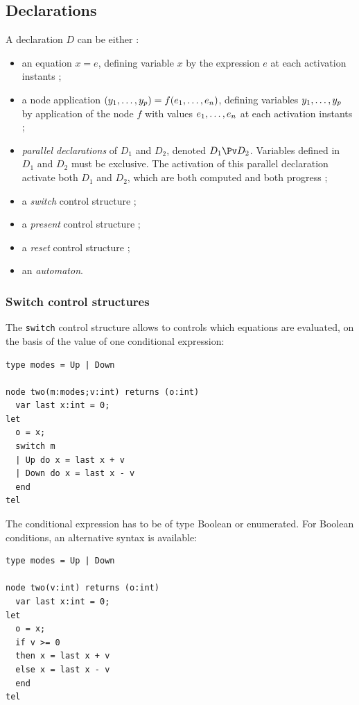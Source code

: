 \documentclass[a4paper]{article}
\begin{document}
\subsection{Declarations}
\label{sec:declarations}

A declaration $D$ can be either :
\begin{itemize}
\item an equation $x = e$, defining variable $x$ by the expression $e$ at each
  activation instants ;
\item a node application $(\tonp{y}{,}) = f(\ton{e}{,})$, defining variables
  $\tonp{y}{,}$ by application of the node $f$ with values $\ton{e}{,}$ at each
  activation instants ;
\item \emph{parallel declarations} of $D_1$ and $D_2$, denoted $D_1\Pv D_2$.
 Variables defined in $D_1$ and $D_2$ must be
  exclusive. The activation of this parallel declaration activate both $D_1$ and
  $D_2$, which are both computed and both progress ;
\item a \emph{switch} control structure ;
\item a \emph{present} control structure ;
\item a \emph{reset} control structure ;
\item an \emph{automaton}.
\end{itemize}

\subsubsection{Switch control structures}
\label{sec:switch-contr-struct}

The \lstinline{switch} control structure allows to controls which equations are
evaluated, on the basis of the value of one conditional expression:

\begin{lstlisting}
type modes = Up | Down

node two(m:modes;v:int) returns (o:int)
  var last x:int = 0;
let
  o = x;
  switch m
  | Up do x = last x + v
  | Down do x = last x - v
  end
tel
\end{lstlisting}

The conditional expression has to be of type Boolean or
enumerated. For Boolean conditions, an alternative syntax is
available:

\begin{lstlisting}
type modes = Up | Down

node two(v:int) returns (o:int)
  var last x:int = 0;
let
  o = x;
  if v >= 0
  then x = last x + v
  else x = last x - v
  end
tel
\end{lstlisting}
\end{document}
